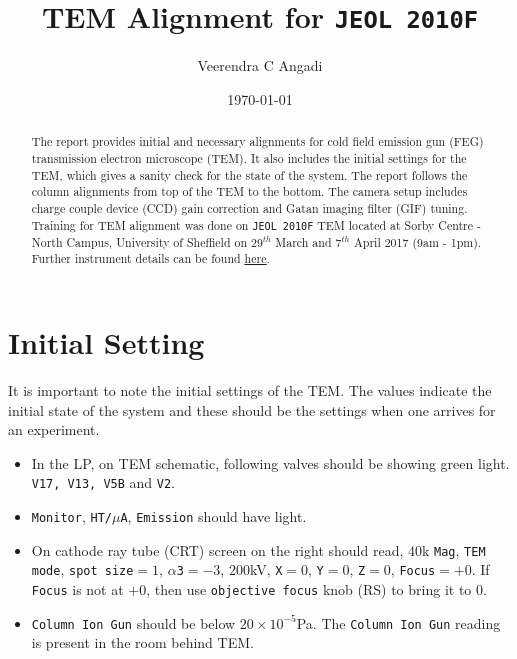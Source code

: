 \documentclass[letterpaper,12pt]{article}
\begin{document}
\title{TEM Alignment for \texttt{JEOL 2010F} }
\author{Veerendra C Angadi}
\date{\today}
\maketitle

\begin{abstract}
The report provides initial and necessary alignments for cold field emission gun (FEG) transmission electron microscope (TEM). It also includes the initial settings for the TEM, which gives a sanity check for the state of the system. The report follows the column alignments from top of the TEM to the bottom. The camera setup includes charge couple device (CCD) gain correction and Gatan imaging filter (GIF) tuning. Training for TEM alignment was done on \texttt{JEOL 2010F} TEM located at Sorby Centre - North Campus, University of Sheffield on 29$^{th}$ March and 7$^{th}$ April 2017 (9am - 1pm). Further instrument details can be found \href{https://www.sheffield.ac.uk/eee/research/microscopy/fegtem_instrument_details}{\underline{here}}.
\end{abstract}

\section{Initial Setting}

It is important to note the initial settings of the TEM. The values indicate the initial state of the system and these should be the settings when one arrives for an experiment.

\begin{itemize}
\item In the LP\footnotemark[1], on TEM schematic, following valves should be showing green light. \texttt{V17, V13, V5B} and \texttt{V2}.
\item \texttt{Monitor}, \texttt{HT/$\mu$A}, \texttt{Emission} should have light.
\item On cathode ray tube (CRT) screen on the right should read, $40$k \texttt{Mag}, \texttt{TEM mode}, \texttt{spot size}$=1$, \texttt{$\alpha$3}$=-3$, $200$kV, \texttt{X}$=0$, \texttt{Y}$=0$, \texttt{Z}$=0$, \texttt{Focus}$=+0$. If \texttt{Focus} is not at $+0$, then use \texttt{objective focus} knob (RS\footnotemark[1]) to bring it to $0$.
\item \texttt{Column Ion Gun} should be below $20\times10^{-5}$Pa. The \texttt{Column Ion Gun} reading is present in the room behind TEM.
\end{itemize}
\end{document}
